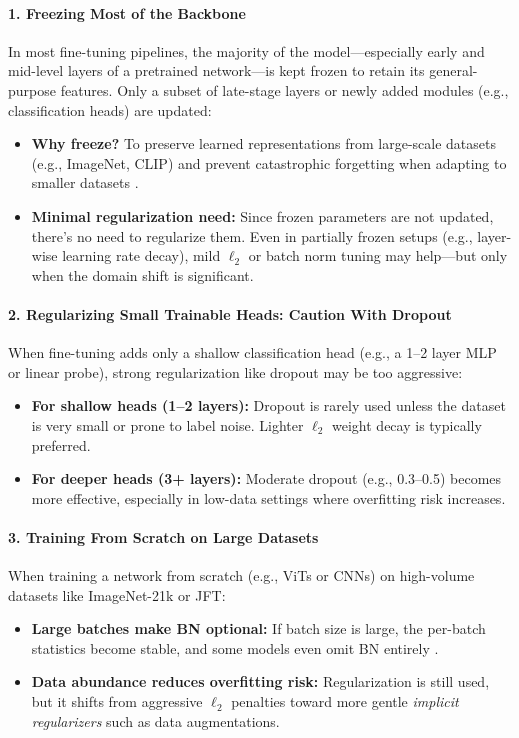 \newpage
\begin{enrichment}
	\label{enrichment:fine_tuning_regularization}
	
	\paragraph{1. Freezing Most of the Backbone}
	In most fine-tuning pipelines, the majority of the model—especially early and mid-level layers of a pretrained network—is kept frozen to retain its general-purpose features. Only a subset of late-stage layers or newly added modules (e.g., classification heads) are updated:
	\begin{itemize}
		\item \textbf{Why freeze?} To preserve learned representations from large-scale datasets (e.g., ImageNet, CLIP) and prevent catastrophic forgetting when adapting to smaller datasets \cite{howard2018_universal}.
		\item \textbf{Minimal regularization need:} Since frozen parameters are not updated, there’s no need to regularize them. Even in partially frozen setups (e.g., layer-wise learning rate decay), mild \(\ell_2\) or batch norm tuning may help—but only when the domain shift is significant.
	\end{itemize}
	
	\paragraph{2. Regularizing Small Trainable Heads: Caution With Dropout}
	When fine-tuning adds only a shallow classification head (e.g., a 1–2 layer MLP or linear probe), strong regularization like dropout may be too aggressive:
	\begin{itemize}
		\item \textbf{For shallow heads (1–2 layers):} Dropout is rarely used unless the dataset is very small or prone to label noise. Lighter \(\ell_2\) weight decay is typically preferred.
		\item \textbf{For deeper heads (3+ layers):} Moderate dropout (e.g., 0.3–0.5) becomes more effective, especially in low-data settings where overfitting risk increases.
	\end{itemize}
	
	\paragraph{3. Training From Scratch on Large Datasets}
	When training a network from scratch (e.g., ViTs or CNNs) on high-volume datasets like ImageNet-21k or JFT:
	\begin{itemize}
		\item \textbf{Large batches make BN optional:} If batch size is large, the per-batch statistics become stable, and some models even omit BN entirely \cite{zhang2019_fixup, vit2020_transformers}.
		\item \textbf{Data abundance reduces overfitting risk:} Regularization is still used, but it shifts from aggressive \(\ell_2\) penalties toward more gentle \emph{implicit regularizers} such as data augmentations.
	\end{itemize}
	

\end{enrichment}
